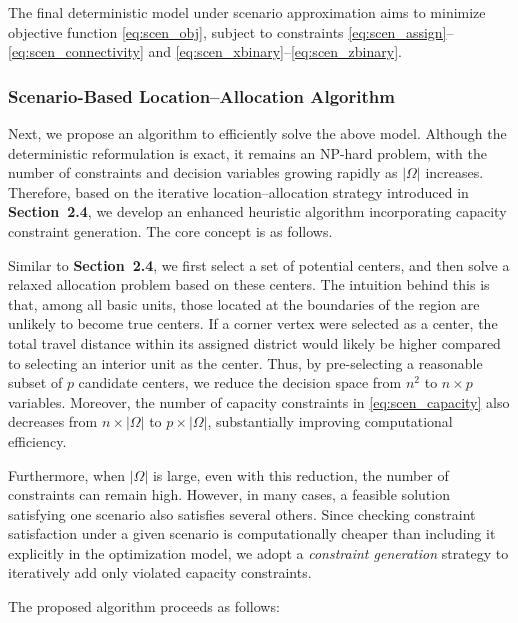 \documentclass[preprint,12pt,authoryear]{elsarticle}
\begin{document}
The final deterministic model under scenario approximation aims to minimize objective function \eqref{eq:scen_obj}, subject to constraints \eqref{eq:scen_assign}--\eqref{eq:scen_connectivity} and \eqref{eq:scen_xbinary}--\eqref{eq:scen_zbinary}.

\subsubsection{Scenario-Based Location–Allocation Algorithm}

Next, we propose an algorithm to efficiently solve the above model. Although the deterministic reformulation is exact, it remains an NP-hard problem, with the number of constraints and decision variables growing rapidly as $|\Omega|$ increases. Therefore, based on the iterative location–allocation strategy introduced in \textbf{Section~2.4}, we develop an enhanced heuristic algorithm incorporating capacity constraint generation. The core concept is as follows.

Similar to \textbf{Section~2.4}, we first select a set of potential centers, and then solve a relaxed allocation problem based on these centers. The intuition behind this is that, among all basic units, those located at the boundaries of the region are unlikely to become true centers. If a corner vertex were selected as a center, the total travel distance within its assigned district would likely be higher compared to selecting an interior unit as the center. Thus, by pre-selecting a reasonable subset of $p$ candidate centers, we reduce the decision space from $n^2$ to $n \times p$ variables. Moreover, the number of capacity constraints in \eqref{eq:scen_capacity} also decreases from $n \times |\Omega|$ to $p \times |\Omega|$, substantially improving computational efficiency.

Furthermore, when $|\Omega|$ is large, even with this reduction, the number of constraints can remain high. However, in many cases, a feasible solution satisfying one scenario also satisfies several others. Since checking constraint satisfaction under a given scenario is computationally cheaper than including it explicitly in the optimization model, we adopt a \emph{constraint generation} strategy to iteratively add only violated capacity constraints. 

The proposed algorithm proceeds as follows:
\end{document}

